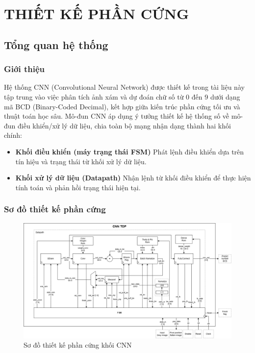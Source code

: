\section{THIẾT KẾ PHẦN CỨNG}
\subsection{Tổng quan hệ thống}
\subsubsection{Giới thiệu}
Hệ thống CNN (Convolutional Neural Network) được thiết kế trong tài liệu này tập trung vào việc phân tích ảnh xám và dự đoán chữ số từ 0 đến 9 dưới dạng mã BCD (Binary-Coded Decimal), kết hợp giữa kiến trúc phần cứng tối ưu và thuật toán học sâu. Mô-đun CNN áp dụng ý tưởng thiết kế hệ thống số về mô-đun điều khiển/xử lý dữ liệu, chia toàn bộ mạng nhận dạng thành hai khối chính:
\begin{itemize}
    \item \textbf{Khối điều khiển (máy trạng thái FSM)} Phát lệnh điều khiển dựa trên tín hiệu và trạng thái từ khối xử lý dữ liệu.
    \item  \textbf{Khối xử lý dữ liệu (Datapath)} Nhận lệnh từ khối điều khiển để thực hiện tính toán và phản hồi trạng thái hiện tại.
\end{itemize}

\subsubsection{Sơ đồ thiết kế phần cứng}
\begin{figure}[H]
    \centering
    \includegraphics[angle=-90, width=0.75\linewidth]{Images/datapath_cnn.drawio.png}
    \caption{Sơ đồ thiết kế phần cứng khối CNN}
    \label{fig:tkpc}
\end{figure}


